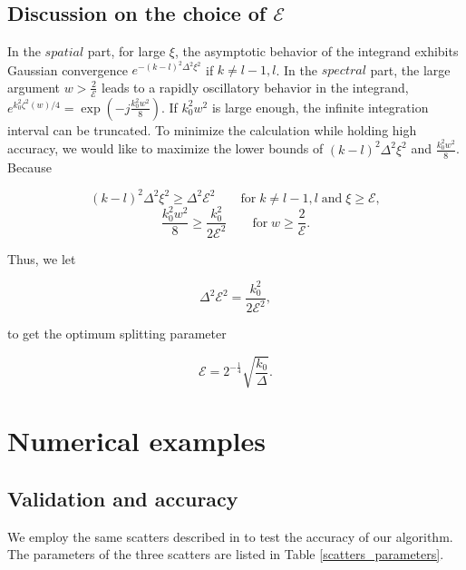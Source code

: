 \documentclass[preprint,12pt]{elsarticle}
\begin{document}
\subsection{Discussion on the choice of $\mathcal{E}$}
 In the $spatial$ part, for large $\xi$,  the asymptotic behavior of the integrand exhibits Gaussian convergence $e^{-(k-l)^2\Delta^2\xi^2}$ if $k \neq l-1, l$. In the $spectral$ part, the large argument ${w}> \frac{2}{\mathcal{E}}$ leads to {a} rapidly oscillatory behavior in the integrand, $e^{k_0^2 \zeta^2(w)/4} = \exp \left( - j\frac{k^2_0 w^2}{8}\right)$. If $k^2_0 w^2$ is large enough, the infinite integration interval can be truncated. To minimize the calculation {while} holding high accuracy, we would like to maximize the lower bounds of $(k-l)^2\Delta^2\xi^2$ and $\frac{k^2_0 w^2}{8}$. Because
 \begin{small}
 \begin{equation}
 (k-l)^2\Delta^2\xi^2 \geq \Delta^2 \mathcal{E}^2  \qquad  \text{for} \; k \neq l-1, l\; \text{and}\;\xi \geq \mathcal{E}  ,
 \end{equation}
 \begin{equation}
 \frac{k^2_0 w^2}{8} \geq \frac{k^2_0}{2\mathcal{E}^2} \qquad \text{for} \; w \geq \frac{2}{\mathcal{E}}.
 \end{equation}
 \end{small}
 Thus, we let
 \begin{small}
 \begin{equation}
 \Delta^2 \mathcal{E}^2 = \frac{k^2_0}{2\mathcal{E}^2},
 \end{equation}
 \end{small}
 to get the optimum splitting parameter 
 \begin{small}
 \begin{equation}
 \mathcal{E} = 2^{-\frac{1}{4}}\sqrt{\frac{k_0}{\Delta}}.
 \end{equation}
 \end{small}
\section{Numerical examples}
\label{numerical_examples}
\subsection{Validation and accuracy}
We employ the same scatters described in \cite{Dilz2016The} to test the accuracy of our algorithm. The parameters of the three scatters are listed in Table \ref{scatters_parameters}.
\end{document}
